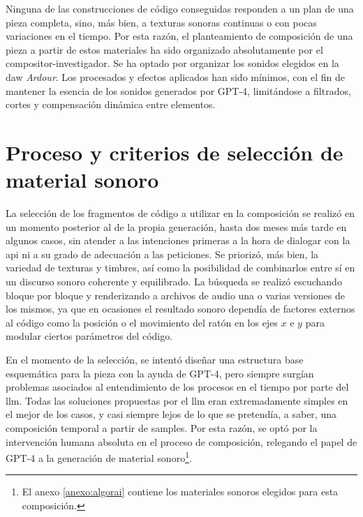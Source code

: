 Ninguna de las construcciones de código conseguidas responden a un plan de una pieza completa, sino, más bien, a texturas sonoras continuas o con pocas variaciones en el tiempo. Por esta razón, el planteamiento de composición de una pieza a partir de estos materiales ha sido organizado absolutamente por el compositor-investigador. Se ha optado por organizar los sonidos elegidos en la \gls{daw} \emph{Ardour}. Los procesados y efectos aplicados han sido mínimos, con el fin de mantener la esencia de los sonidos generados por GPT-4, limitándose a filtrados, cortes y compensación dinámica entre elementos. 




\section{Proceso y criterios de selección de material sonoro}

La selección de los fragmentos de código a utilizar en la composición se realizó en un momento posterior al de la propia generación, hasta dos meses más tarde en algunos casos, sin atender a las intenciones primeras a la hora de dialogar con la \gls{api} ni a su grado de adecuación a las peticiones. Se priorizó, más bien, la variedad de texturas y timbres, así como la posibilidad de combinarlos entre sí en un discurso sonoro coherente y equilibrado. La búsqueda se realizó escuchando bloque por bloque y renderizando a archivos de audio una o varias versiones de los mismos, ya que en ocasiones el resultado sonoro dependía de factores externos al código como la posición o el movimiento del ratón en los ejes $x$ e $y$ para modular ciertos parámetros del código. 

En el momento de la selección, se intentó diseñar una estructura base esquemática para la pieza con la ayuda de GPT-4, pero siempre surgían problemas asociados al entendimiento de los procesos en el tiempo por parte del \gls{llm}. Todas las soluciones propuestas por el \gls{llm} eran extremadamente simples en el mejor de los casos, y casi siempre lejos de lo que se pretendía, a saber, una composición temporal a partir de samples. Por esta razón, se optó por la intervención humana absoluta en el proceso de composición, relegando el papel de GPT-4 a la generación de material sonoro\footnote{El anexo \ref{anexo:algorai} contiene los materiales sonoros elegidos para esta composición.}.

